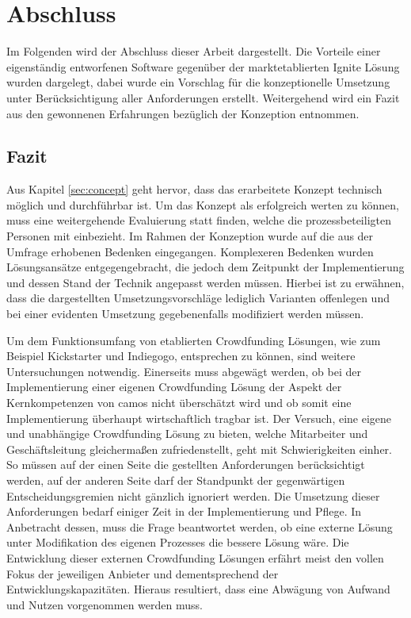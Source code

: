 \chapter{Abschluss}
Im Folgenden wird der Abschluss dieser Arbeit dargestellt. Die Vorteile einer eigenständig entworfenen Software gegenüber der marktetablierten Ignite Lösung wurden dargelegt, dabei wurde ein Vorschlag für die konzeptionelle Umsetzung unter Berücksichtigung aller Anforderungen erstellt. Weitergehend wird ein Fazit aus den gewonnenen Erfahrungen bezüglich der Konzeption entnommen.
\section{Fazit}
Aus Kapitel \ref{sec:concept} geht hervor, dass das erarbeitete Konzept technisch möglich und durchführbar ist. Um das Konzept als erfolgreich werten zu können, muss eine weitergehende Evaluierung statt finden, welche die prozessbeteiligten Personen mit einbezieht. Im Rahmen der Konzeption wurde auf die aus der Umfrage erhobenen Bedenken eingegangen. Komplexeren Bedenken wurden Lösungsansätze entgegengebracht, die jedoch dem Zeitpunkt der Implementierung und dessen Stand der Technik angepasst werden müssen. Hierbei ist zu erwähnen, dass die dargestellten Umsetzungsvorschläge lediglich Varianten offenlegen und bei einer evidenten Umsetzung gegebenenfalls modifiziert werden müssen.

Um dem Funktionsumfang von etablierten Crowdfunding Lösungen, wie zum Beispiel Kickstarter und Indiegogo, entsprechen zu können, sind weitere Untersuchungen notwendig. Einerseits muss abgewägt werden, ob bei der Implementierung einer eigenen Crowdfunding Lösung der Aspekt der Kernkompetenzen von camos nicht überschätzt wird und ob somit eine Implementierung überhaupt wirtschaftlich tragbar ist. Der Versuch, eine eigene und unabhängige Crowdfunding Lösung zu bieten, welche Mitarbeiter und Geschäftsleitung gleichermaßen zufriedenstellt, geht mit Schwierigkeiten einher. So müssen auf der einen Seite die gestellten Anforderungen berücksichtigt werden, auf der anderen Seite darf der Standpunkt der gegenwärtigen Entscheidungsgremien nicht gänzlich ignoriert werden. Die Umsetzung dieser Anforderungen bedarf einiger Zeit in der Implementierung und Pflege. In Anbetracht dessen, muss die Frage beantwortet werden, ob eine externe Lösung unter Modifikation des eigenen Prozesses die bessere Lösung wäre. Die Entwicklung dieser externen Crowdfunding Lösungen erfährt meist den vollen Fokus der jeweiligen Anbieter und dementsprechend der Entwicklungskapazitäten. Hieraus resultiert, dass eine Abwägung von Aufwand und Nutzen vorgenommen werden muss. 

